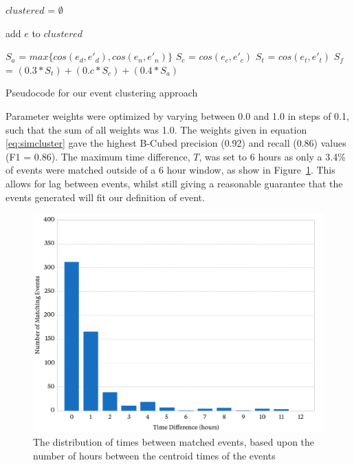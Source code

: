 \begin{algorithm}[t!]
$clustered$ = $\emptyset$\;
 {
	add $e$ to $clustered$\;
	 {

		$S_{a}$ = $max\{cos(e_d, e'_d), cos(e_n, e'_n)\}$\;
		$S_{c}$ = $cos(e_c, e'_c)$\;
		$S_{t}$ = $cos(e_t, e'_t)$\;
		$S_{f}$ = $(0.3 * S_{t}) + (0.c * S_{c}) + (0.4 * S_{a})$\;
		 {
			 
		}
	}
}
\caption{Pseudocode for our event clustering approach}
\label{alg:clustering}
\end{algorithm}

Parameter weights were optimized by varying between 0.0 and 1.0 in steps of 0.1, such that the sum of all weights was 1.0.
The weights given in equation \ref{eq:simcluster} gave the highest B-Cubed precision (0.92) and recall (0.86) values (F1 = 0.86).
The maximum time difference, $T$, was set to 6 hours  as only a 3.4\% of events were matched outside of a 6 hour window, as show in Figure~\ref{fig:dif_diff}.
This allows for lag between events, whilst still giving a reasonable guarantee that the events generated will fit our definition of event.

\begin{figure}
	\includegraphics[width=\textwidth]{./Chapters/Collection/images/times}
	\caption{The distribution of times between matched events, based upon the number of hours between the centroid times of the events}
	\label{fig:dif_diff}
\end{figure}
